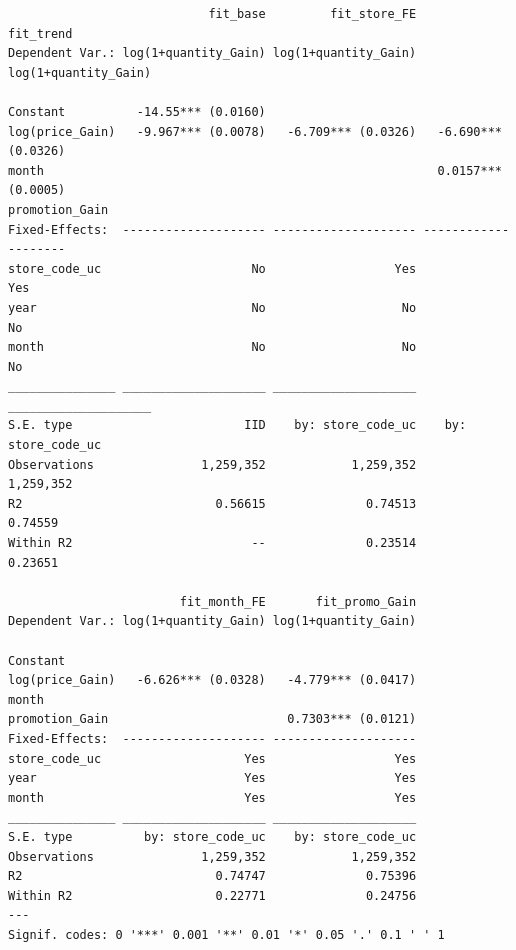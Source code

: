 \documentclass[
]{article}
\begin{document}
\begin{verbatim}
                            fit_base         fit_store_FE            fit_trend
Dependent Var.: log(1+quantity_Gain) log(1+quantity_Gain) log(1+quantity_Gain)
                                                                              
Constant          -14.55*** (0.0160)                                          
log(price_Gain)   -9.967*** (0.0078)   -6.709*** (0.0326)   -6.690*** (0.0326)
month                                                       0.0157*** (0.0005)
promotion_Gain                                                                
Fixed-Effects:  -------------------- -------------------- --------------------
store_code_uc                     No                  Yes                  Yes
year                              No                   No                   No
month                             No                   No                   No
_______________ ____________________ ____________________ ____________________
S.E. type                        IID    by: store_code_uc    by: store_code_uc
Observations               1,259,352            1,259,352            1,259,352
R2                           0.56615              0.74513              0.74559
Within R2                         --              0.23514              0.23651

                        fit_month_FE       fit_promo_Gain
Dependent Var.: log(1+quantity_Gain) log(1+quantity_Gain)
                                                         
Constant                                                 
log(price_Gain)   -6.626*** (0.0328)   -4.779*** (0.0417)
month                                                    
promotion_Gain                         0.7303*** (0.0121)
Fixed-Effects:  -------------------- --------------------
store_code_uc                    Yes                  Yes
year                             Yes                  Yes
month                            Yes                  Yes
_______________ ____________________ ____________________
S.E. type          by: store_code_uc    by: store_code_uc
Observations               1,259,352            1,259,352
R2                           0.74747              0.75396
Within R2                    0.22771              0.24756
---
Signif. codes: 0 '***' 0.001 '**' 0.01 '*' 0.05 '.' 0.1 ' ' 1
\end{verbatim}
\end{document}
